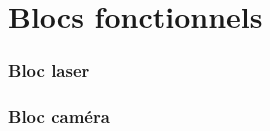 \chapter{Blocs fonctionnels}
\label{chap:blocs_fonctionnels}

\subsection{Bloc laser}

\subsection{Bloc caméra}
